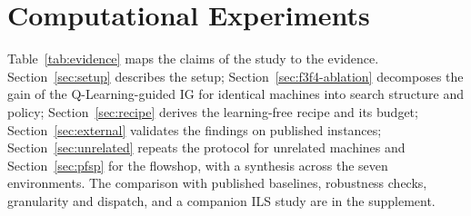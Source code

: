 \section{Computational Experiments}
\label{sec:experiments}

Table~\ref{tab:evidence} maps the claims of the study to the evidence. Section~\ref{sec:setup} describes the setup; Section~\ref{sec:f3f4-ablation} decomposes the gain of the Q-Learning-guided
IG for identical machines into search structure and policy; Section~\ref{sec:recipe} derives the learning-free recipe and its budget; Section~\ref{sec:external} validates the findings on
published instances; Section~\ref{sec:unrelated} repeats the protocol for unrelated machines and Section~\ref{sec:pfsp} for the flowshop, with a synthesis across the seven environments.
The comparison with published baselines, robustness checks, granularity and dispatch, and a companion ILS study are in the supplement.

